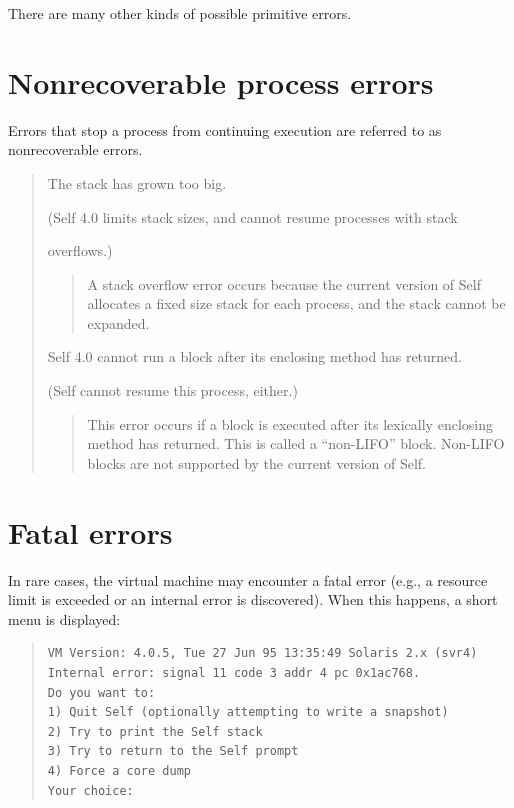 \documentclass[letterpaper,10pt,english]{sphinxmanual}
\begin{document}
There are many other kinds of possible primitive errors.


\section{Nonrecoverable process errors}
\label{vmref:nonrecoverable-process-errors}
Errors that stop a process from continuing execution are referred to as nonrecoverable errors.
\begin{quote}

\begin{DUlineblock}{0em}
\item[] The stack has grown too big.
\item[] (Self 4.0 limits stack sizes, and cannot resume processes with stack
\item[] overflows.)
\end{DUlineblock}
\begin{quote}

A stack overflow error occurs because the current version of Self allocates a
fixed size stack for each process, and the stack cannot be expanded.
\end{quote}

\begin{DUlineblock}{0em}
\item[] Self 4.0 cannot run a block after its enclosing method has returned.
\item[] (Self cannot resume this process, either.)
\end{DUlineblock}
\begin{quote}

This error occurs if a block is executed after its lexically enclosing method has returned.
This is called a “non-LIFO” block. Non-LIFO blocks are not supported by
the current version of Self.
\end{quote}
\end{quote}


\section{Fatal errors}
\label{vmref:index-7}\label{vmref:fatal-errors}
In rare cases, the virtual machine may encounter a fatal error (e.g., a resource limit is exceeded or
an internal error is discovered). When this happens, a short menu is displayed:
\begin{quote}

\begin{Verbatim}[commandchars=\\\{\}]
VM Version: 4.0.5, Tue 27 Jun 95 13:35:49 Solaris 2.x (svr4)
Internal error: signal 11 code 3 addr 4 pc 0x1ac768.
Do you want to:
1) Quit Self (optionally attempting to write a snapshot)
2) Try to print the Self stack
3) Try to return to the Self prompt
4) Force a core dump
Your choice:
\end{Verbatim}
\end{quote}
\end{document}

